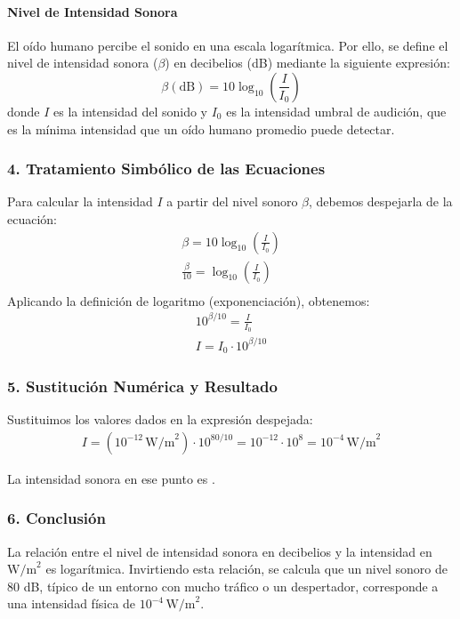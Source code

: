 \paragraph*{Nivel de Intensidad Sonora}
El oído humano percibe el sonido en una escala logarítmica. Por ello, se define el nivel de intensidad sonora ($\beta$) en decibelios (dB) mediante la siguiente expresión:
$$ \beta (\text{dB}) = 10 \log_{10}\left(\frac{I}{I_0}\right) $$
donde $I$ es la intensidad del sonido y $I_0$ es la intensidad umbral de audición, que es la mínima intensidad que un oído humano promedio puede detectar.

\subsubsection*{4. Tratamiento Simbólico de las Ecuaciones}
Para calcular la intensidad $I$ a partir del nivel sonoro $\beta$, debemos despejarla de la ecuación:
\begin{gather}
    \beta = 10 \log_{10}\left(\frac{I}{I_0}\right) \nonumber \\
    \frac{\beta}{10} = \log_{10}\left(\frac{I}{I_0}\right) \nonumber \\
\end{gather}
Aplicando la definición de logaritmo (exponenciación), obtenemos:
\begin{gather}
    10^{\beta/10} = \frac{I}{I_0} \nonumber \\
    I = I_0 \cdot 10^{\beta/10}
\end{gather}

\subsubsection*{5. Sustitución Numérica y Resultado}
Sustituimos los valores dados en la expresión despejada:
\begin{gather}
    I = (10^{-12} \, \text{W/m}^2) \cdot 10^{80/10} = 10^{-12} \cdot 10^8 = 10^{-4} \, \text{W/m}^2
\end{gather}
\begin{cajaresultado}
    La intensidad sonora en ese punto es .
\end{cajaresultado}

\subsubsection*{6. Conclusión}
\begin{cajaconclusion}
La relación entre el nivel de intensidad sonora en decibelios y la intensidad en $\text{W/m}^2$ es logarítmica. Invirtiendo esta relación, se calcula que un nivel sonoro de 80 dB, típico de un entorno con mucho tráfico o un despertador, corresponde a una intensidad física de $10^{-4} \, \text{W/m}^2$.
\end{cajaconclusion}

